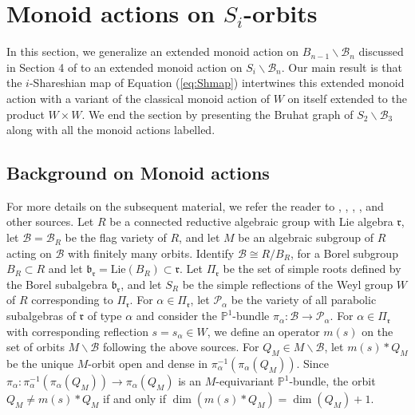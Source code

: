\documentclass[12pt]{amsart}
\numberwithin{equation}{section}
\theoremstyle{remark}
\theoremstyle{definition}
\newcommand{\fr}{\mbox{${\mathfrak r}$}}
\newcommand{\fb}{\mbox{${\mathfrak b}$}}
\newcommand{\B}{\mathcal{B}}
\newcommand{\Borbitspace}{B_{n-1}\backslash\B_{n}}
\begin{document}
\section{Monoid actions on $S_{i}$-orbits}\label{s:monoid} 
In this section, we generalize an extended monoid action on $\Borbitspace$ discussed in Section 4 of \cite{CE21I} to an extended monoid action on $S_{i}\backslash\B_{n}$.  Our main result is that the $i$-Shareshian map of Equation (\ref{eq:Shmap}) intertwines this  extended monoid action with a variant of the classical monoid action of $W$ on itself extended to the product $W\times W$.  We end the section by presenting the Bruhat graph of $S_{2}\backslash\B_{3}$ along with all the monoid actions labelled.  


\subsection{Background on Monoid actions}\label{ss:monoidbackground}

For more details on the subsequent material, we refer the reader to \cite{RS}, \cite{Vg}, \cite{CEexp}, \cite{CE21I}, and other sources.
Let $R$ be a connected reductive algebraic group with Lie algebra $\fr$, let $\B=\B_{R}$ be the flag 
variety of $R$, and let $M$ be an algebraic subgroup of $R$ acting on $\B$ with finitely many orbits.  Identify $\B \cong R/B_{R}$, for a Borel subgroup $B_{R}\subset R$ and let $\fb_{\fr}=\mbox{Lie}(B_{R})\subset\fr$.  
Let $\Pi_{\fr}$ be the set of simple roots defined by the Borel subalgebra $\fb_{\fr}$, and let $S_{R}$ be the simple reflections of the Weyl group $W$ of $R$ corresponding to $\Pi_{\fr}$.  For $\alpha\in \Pi_{\fr}$, let $\mathcal{P}_{\alpha}$ be the variety of all parabolic subalgebras of $\fr$ of type $\alpha$ and consider the $\mathbb{P}^{1}$-bundle $\pi_{\alpha}:\B \to {\mathcal{P}}_{\alpha}$.  %
For $\alpha \in \Pi_{\fr}$ with corresponding reflection $s=s_{\alpha} \in W$, we define an operator $m(s)$ on the set of orbits $M\backslash \B$ following the above sources.  For $Q_M \in M\backslash \B$, let $m(s)*Q_{M}$ be the unique $M$-orbit open and dense in $\pi_{\alpha}^{-1}(\pi_{\alpha}(Q_{M})).$  
Since $\pi_{\alpha}: \pi_{\alpha}^{-1}(\pi_{\alpha}(Q_{M}))\to \pi_{\alpha}(Q_{M})$ is an $M$-equivariant 
$\mathbb{P}^{1}$-bundle, the orbit  $Q_{M} \not= m(s)*Q_{M}$ if and only if $\dim(m(s)*Q_{M})=\dim(Q_{M})+1.$
\end{document}
